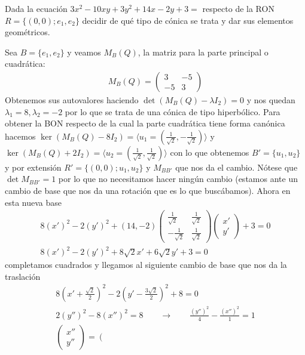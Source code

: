 \documentclass[14pt]{book}
\begin{document}
\begin{ej}
	Dada la ecuación $3x^2 - 10xy + 3y^2 + 14x - 2y + 3 = $ respecto de la RON $R = \{(0,0); e_1, e_2\}$ decidir de qué tipo de cónica se trata y dar sus elementos geométricos.
	
	Sea $B = \{e_1, e_2\}$ y veamos $M_B(Q)$, la matriz para la parte principal o cuadrática:
	\begin{align*}
		M_B(Q) = \left(\begin{array}{cc}
		3 & -5 \\ -5 & 3
		\end{array}\right)
	\end{align*}
	Obtenemos sus autovalores haciendo $\det (M_B(Q) - \lambda I_2) = 0$ y nos quedan $\lambda_1 = 8, \lambda_2 = -2$ por lo que se trata de una cónica de tipo hiperbólico. Para obtener la BON respecto de la cual la parte cuadrática tiene forma canónica hacemos $\ker (M_B(Q) - 8I_2) = \langle u_1 = (\frac{1}{\sqrt{2}}, -\frac{1}{\sqrt{2}})\rangle$ y $\ker (M_B(Q) + 2I_2) = \langle u_2 = (\frac{1}{\sqrt{2}}, \frac{1}{\sqrt{2}})\rangle$ con lo que obtenemos $B' = \{u_1, u_2\}$ y por extensión $R' = \{(0,0); u_1, u_2\}$ y $M_{BB'}$ que nos da el cambio. Nótese que $\det M_{BB'} = 1$ por lo que no necesitamos hacer ningún cambio (estamos ante un cambio de base que nos da una rotación que es lo que buscábamos). Ahora en esta nueva base
	\begin{align*}
		8(x')^2 - 2(y')^2 + (14, -2)\left(\begin{array}{cc}
		\frac{1}{\sqrt{2}} & \frac{1}{\sqrt{2}} \\
		-\frac{1}{\sqrt{2}} & \frac{1}{\sqrt{2}}
		\end{array}\right)\left(\begin{array}{c}
		x' \\ y'
		\end{array}\right) + 3 = 0 \\
		8(x')^2 - 2(y')^2 + 8\sqrt{2}x' + 6\sqrt{2}y' + 3 = 0
	\end{align*} 
	completamos cuadrados y llegamos al siguiente cambio de base que nos da la traslación
	\begin{align*}
		8(x' + \frac{\sqrt{2}}{2})^2 - 2(y' - \frac{3\sqrt{2}}{2})^2 + 8 = 0 \\
		2(y'')^2 - 8(x'')^2 = 8 \qquad \to \qquad
		\frac{(y'')^2}{4} - \frac{(x'')^2}{1} = 1 \\
		\left(\begin{array}{c}
		x'' \\ y''
		\end{array}\right) = \left(\begin{array}{c}

\end{array}
\end{align*}
\end{ej}
\end{document}
